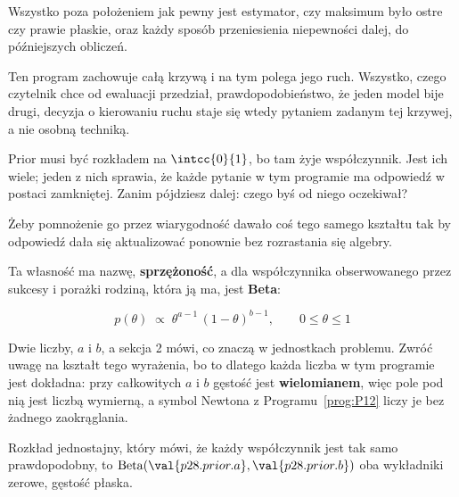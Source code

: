 \begin{fr}
\begin{ansblock}
Wszystko poza położeniem \dash{} jak pewny jest estymator, czy maksimum było
ostre czy prawie płaskie, oraz każdy sposób przeniesienia niepewności dalej,
do późniejszych obliczeń.
\end{ansblock}


Ten program zachowuje całą krzywą i na tym polega jego ruch.
Wszystko, czego czytelnik chce od ewaluacji \dash{} przedział,
prawdopodobieństwo, że jeden model bije drugi, decyzja o kierowaniu ruchu
\dash{} staje się wtedy pytaniem zadanym tej krzywej, a nie osobną techniką.

Prior musi być rozkładem na $\intcc{0}{1}$, bo tam żyje współczynnik. Jest ich
wiele; jeden z nich sprawia, że każde pytanie w tym programie ma odpowiedź w
postaci zamkniętej. Zanim pójdziesz dalej: czego byś od niego oczekiwał?
\dotline
\nextframe
\end{fr}

\begin{fr}
\begin{ansblock}
Żeby pomnożenie go przez wiarygodność dawało coś tego samego kształtu
\dash{} tak by odpowiedź dała się aktualizować ponownie bez rozrastania się
algebry.
\end{ansblock}

Ta własność ma nazwę, \textbf{sprzężoność}, a dla
współczynnika obserwowanego przez sukcesy i porażki rodziną, która ją ma,
jest \textbf{Beta}:

\[ p(\theta) \;\propto\; \theta^{a-1}\,(1-\theta)^{b-1},
   \qquad 0 \le \theta \le 1 \]

Dwie liczby, $a$ i $b$, a sekcja 2 mówi, co znaczą w jednostkach problemu.
Zwróć uwagę na kształt tego wyrażenia, bo to dlatego każda liczba w tym
programie jest dokładna: przy całkowitych $a$ i $b$ gęstość jest
\textbf{wielomianem}, więc pole pod nią jest liczbą wymierną, a symbol
Newtona z Programu~\ref{prog:P12} liczy je bez żadnego zaokrąglania.

Rozkład jednostajny, który mówi, że każdy współczynnik jest tak samo
prawdopodobny, to $\mathrm{Beta}(\val{p28.prior.a}, \val{p28.prior.b})$
\dash{} oba wykładniki zerowe, gęstość płaska.
\end{fr}

